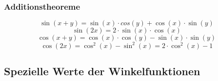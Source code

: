 \subsubsection{Additionstheoreme}
\[ \boxed{\sin(x+y) = \sin(x) \cdot cos(y) + \cos(x) \cdot \sin(y) }\]
\[ \boxed{\sin(2x) = 2 \cdot \sin(x) \cdot \cos(x) }\]
\[ \boxed{\cos(x+y) = \cos(x) \cdot \cos(y) - \sin(x) \cdot \sin(y) }\]
\[ \boxed{\cos(2x) = \cos^2(x) - \sin^2(x) = 2 \cdot \cos^2(x) - 1 }\]

\subsection{Spezielle Werte der Winkelfunktionen} \label{tab:spez-winkel}

